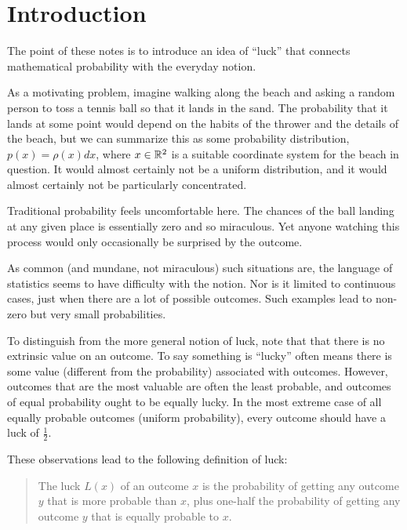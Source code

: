 \chapter{Introduction}

The point of these notes is to introduce an idea of ``luck'' that connects mathematical probability with the everyday notion.

As a motivating problem, imagine walking along the beach and asking a random person to toss a tennis ball so that it lands in the sand.  The probability that it lands at some point would depend on the habits of the thrower and the details of the beach, but we can summarize this as some probability distribution, $p(x)=\rho(x) dx$, where $x\in\mathbb{R}^2$ is a suitable coordinate system for the beach in question.  It would almost certainly not be a uniform distribution, and it would almost certainly not be particularly concentrated.

Traditional probability feels uncomfortable here.  The chances of the ball landing at any given place is essentially zero and so miraculous. Yet anyone watching this process would only occasionally be surprised by the outcome.

As common (and mundane, not miraculous) such situations are, the language of statistics seems to have difficulty with the notion.  Nor is it limited to continuous cases, just when there are a lot of possible outcomes.  Such examples lead to non-zero but very small probabilities.

To distinguish from the more general notion of luck, note that that there is no extrinsic value on an outcome.  To say something is ``lucky'' often means there is some value (different from the probability) associated with outcomes.  However, outcomes that are the most valuable are often the least probable, and outcomes of equal probability ought to be equally lucky.  In the most extreme case of all equally probable outcomes (uniform probability), every outcome should have a luck of $\frac{1}{2}$.

These observations lead to the following definition of luck:
\begin{quote}
The luck $L(x)$ of an outcome $x$ is the probability of getting any outcome $y$ that is more probable than $x$, plus one-half the probability of getting any outcome $y$ that is equally probable to $x$.
\end{quote}

